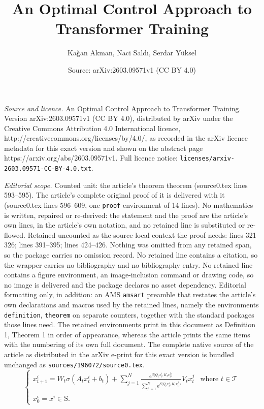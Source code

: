 \documentclass[10pt,a4paper]{amsart}
\title{An Optimal Control Approach to Transformer Training}
\author{Ka\u{g}an Akman, Naci Sald{\i}, Serdar Y\"uksel}
\date{Source: arXiv:2603.09571v1 (CC BY 4.0)}
\newcommand{\cT}{\mathcal{T}}
\newcommand{\e}{\mathrm{e}} %
\newcommand{\inner}[2]{\langle#1, #2\rangle}
\begin{document}
\maketitle

\noindent\emph{Source and licence.} An Optimal Control Approach to Transformer Training. Version arXiv:2603.09571v1 (CC BY 4.0), distributed by arXiv under the Creative Commons Attribution 4.0 International licence, http://creativecommons.org/licenses/by/4.0/, as recorded in the arXiv licence metadata for this exact version and shown on the abstract page https://arxiv.org/abs/2603.09571v1. Full licence notice: \texttt{licenses/arxiv-2603.09571-CC-BY-4.0.txt}.\par\smallskip

\noindent\textit{Editorial scope.} Counted unit: the article's theorem theorem (source0.tex lines 593--595). The article's complete original proof of it is delivered with it (source0.tex lines 596--609, one \texttt{proof} environment of 14 lines). No mathematics is written, repaired or re-derived: the statement and the proof are the article's own lines, in the article's own notation, and no retained line is substituted or re-flowed.  Retained uncounted as the source-local context the proof needs: lines 321--326; lines 391--395; lines 424--426.  Nothing was omitted from any retained span, so the package carries no omission record.  No retained line contains a citation, so the wrapper carries no bibliography and no bibliography entry.  No retained line contains a figure environment, an image-inclusion command or drawing code, so no image is delivered and the package declares no asset dependency.  Editorial formatting only, in addition: an AMS \texttt{amsart} preamble that restates the article's own declarations and macros used by the retained lines, namely the environments \texttt{definition}, \texttt{theorem} on separate counters, together with the standard packages those lines need.  The retained environments print in this document as Definition 1, Theorem 1 in order of appearance, whereas the article prints the same items with the numbering of its own full document.  The complete native source of the article as distributed in the arXiv e-print for this exact version is bundled unchanged as \texttt{sources/196072/source0.tex}.
\begin{equation}\label{eq:dynamics}
    \begin{cases}
        \displaystyle x_{t+1}^i = W_t\sigma(A_tx_t^i + b_t) + \sum_{j=1}^N \frac{ \e^{\beta\inner{Q_tx_t^i}{K_tx_t^j}}}{\sum_{j^\prime=1}^N\e^{\beta\inner{Q_tx_t^i}{K_tx_t^{j^\prime}}}}V_tx_t^j & \text{where } t\in\cT \\
        \displaystyle x^i_0 = x^i \in \mathrm{S}.
    \end{cases}
\end{equation}
\end{document}
